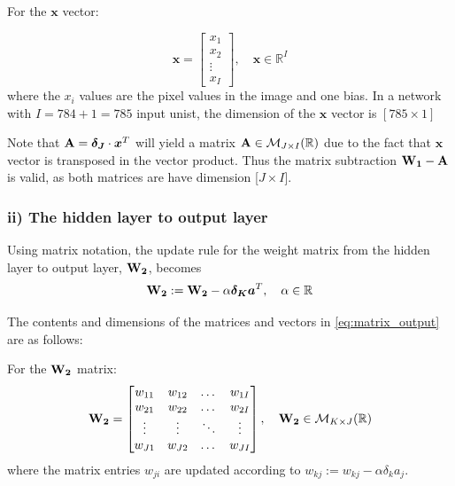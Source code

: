 \documentclass{article}
\begin{document}
For the $\boldsymbol{x}$ vector:

\begin{equation}
    \boldsymbol{x} = 
    \begin{bmatrix}
        x_1 \\
        x_2 \\
        \vdots \\
        x_I
    \end{bmatrix}
    , \quad \boldsymbol{x} \in \mathbb{R}^I
\end{equation}
where the $x_i$ values are the pixel values in the image and one bias. In a network with $I = 784 + 1 = 785$ input unist, the dimension of the $\boldsymbol{x}$ vector is $[785\times1]$

Note that $\text{\textbf{A}} = \boldsymbol{\delta_J} \cdot \boldsymbol{x}^T$ will yield a matrix $\text{\textbf{A}} \in \mathcal{M}_{J \times I}(\mathbb{R})$ due to the fact that $\boldsymbol{x}$ vector is transposed in the vector product. Thus the matrix subtraction $\text{\textbf{W}}_\textbf{1} - \text{\textbf{A}}$ is valid, as both matrices are have dimension [$J \times I$].  

\subsubsection*{ii) The hidden layer to output layer} 
Using matrix notation, the update rule for the weight matrix from the hidden layer to output layer, $\text{\textbf{W}}_\textbf{2}$, becomes 
\begin{equation}
    \text{\textbf{W}}_\textbf{2} := \text{\textbf{W}}_\textbf{2} - \alpha \boldsymbol{\delta_K} \boldsymbol{a}^T,\quad \alpha \in \mathbb{R}
    \label{eq:matrix_output}
\end{equation}

The contents and dimensions of the matrices and vectors in \eqref{eq:matrix_output} are as follows: 


For the $\text{\textbf{W}}_\textbf{2}$ matrix:
\begin{equation}
    \text{\textbf{W}}_\textbf{2} =
    \begin{bmatrix}
        w_{11} & w_{12}& \dots & w_{1I} \\
         w_{21} & w_{22}& \dots & w_{2I} \\
        \vdots & \vdots & \ddots & \vdots \\
         w_{J1} & w_{J2}& \dots & w_{JI} \\
    \end{bmatrix}
    , \quad \text{\textbf{W}}_\textbf{2} \in \mathcal{M}_{K \times J}(\mathbb{R})
\end{equation}
where the matrix entries $w_{ji}$ are updated according to $w_{k j}:=w_{k j}-\alpha \delta_{k} a_{j}$.
\end{document}
